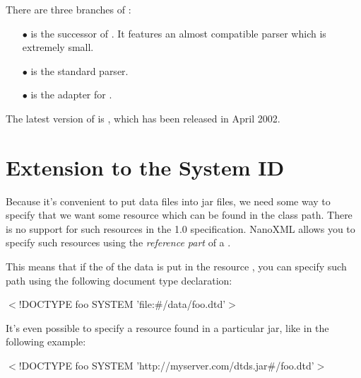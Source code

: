 There are three branches of :
\begin{itemize}
  \item[$\bullet$]
     is the successor of .
    It features an almost compatible parser which is extremely small.
  \item[$\bullet$]
     is the standard parser.
  \item[$\bullet$]
     is the  adapter for .
\end{itemize}

The latest version of \NanoXML{} is , which has been
released in April 2002.

\section{\NanoXML{} Extension to the \XML{} System ID}

Because it's convenient to put data files into jar files, we need some way to specify that we want some resource which can be found in the class path.
There is no support for such resources in the \XML{} 1.0 specification.
NanoXML allows you to specify such resources using the
\emph{reference part} of a .

This means that if the  of the \XML{} data is put in the
resource , you can specify such path using the 
following document type declaration:

\begin{example}
$<$!DOCTYPE foo SYSTEM 'file:\#/data/foo.dtd'$>$
\end{example}

It's even possible to specify a resource found in a particular jar, like in the following example:

\begin{example}
$<$!DOCTYPE foo SYSTEM 'http://myserver.com/dtds.jar\#/foo.dtd'$>$
\end{example}


